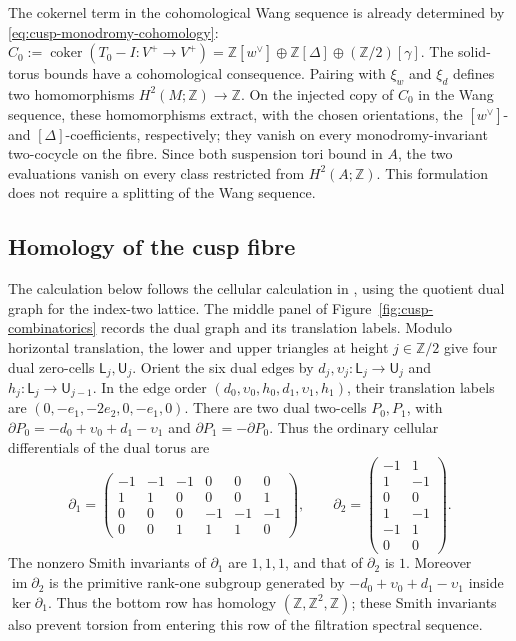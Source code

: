 \documentclass[11pt]{article}
\theoremstyle{definition}
\theoremstyle{remark}
\numberwithin{equation}{section}
\begin{document}
The cokernel term in the cohomological Wang sequence is already determined by
\eqref{eq:cusp-monodromy-cohomology}:
$C_0:=\operatorname{coker}(T_0-I:V^+\to V^+)
=\mathbb Z[w^\vee]\oplus\mathbb Z[\Delta]
\oplus(\mathbb Z/2)[\gamma]$.
The solid-torus bounds have a cohomological consequence.  Pairing with
$\xi_w$ and $\xi_d$ defines two homomorphisms
$H^2(M;\mathbb Z)\to\mathbb Z$.  On the injected copy of $C_0$ in the
Wang sequence, these homomorphisms extract, with the chosen orientations,
the $[w^\vee]$- and $[\Delta]$-coefficients, respectively; they vanish on
every monodromy-invariant two-cocycle on the fibre.  Since both suspension
tori bound in $A$, the two evaluations vanish on every class restricted from
$H^2(A;\mathbb Z)$.  This formulation does not require a splitting of the
Wang sequence.

\subsection{Homology of the cusp fibre}

The calculation below follows the cellular calculation in
\citep[Appendix~A]{Alpoge2026}, using the quotient dual graph for the
index-two lattice.  The middle panel of
Figure~\ref{fig:cusp-combinatorics} records the dual graph and its translation
labels.
Modulo horizontal translation, the lower and upper triangles at height
$j\in\mathbb Z/2$ give four dual zero-cells
$\mathsf L_j,\mathsf U_j$.  Orient the six dual edges by
$d_j,\upsilon_j:\mathsf L_j\to\mathsf U_j$ and
$h_j:\mathsf L_j\to\mathsf U_{j-1}$.
In the edge order $(d_0,\upsilon_0,h_0,d_1,\upsilon_1,h_1)$, their
translation labels are
$(0,-e_1,-2e_2,0,-e_1,0)$.  There are two dual two-cells
$P_0,P_1$, with $\partial P_0=-d_0+\upsilon_0+d_1-\upsilon_1$ and
$\partial P_1=-\partial P_0$.
Thus the ordinary cellular differentials of the dual torus are
\begin{equation}\label{eq:dual-torus-differentials}
 \partial_1=
 \begin{pmatrix}
 -1&-1&-1& 0& 0& 0\\
  1& 1& 0& 0& 0& 1\\
  0& 0& 0&-1&-1&-1\\
  0& 0& 1& 1& 1& 0
 \end{pmatrix},
 \qquad
 \partial_2=
 \begin{pmatrix}
 -1& 1\\ 1&-1\\ 0&0\\ 1&-1\\-1&1\\0&0
 \end{pmatrix}.
\end{equation}
The nonzero Smith invariants of $\partial_1$ are $1,1,1$, and that of
$\partial_2$ is $1$.  Moreover $\operatorname{im}\partial_2$ is the
primitive rank-one subgroup generated by
$-d_0+\upsilon_0+d_1-\upsilon_1$ inside $\ker\partial_1$.  Thus the
bottom row has homology $(\mathbb Z,\mathbb Z^2,\mathbb Z)$; these Smith
invariants also prevent torsion from entering this row of the filtration
spectral sequence.
\end{document}
